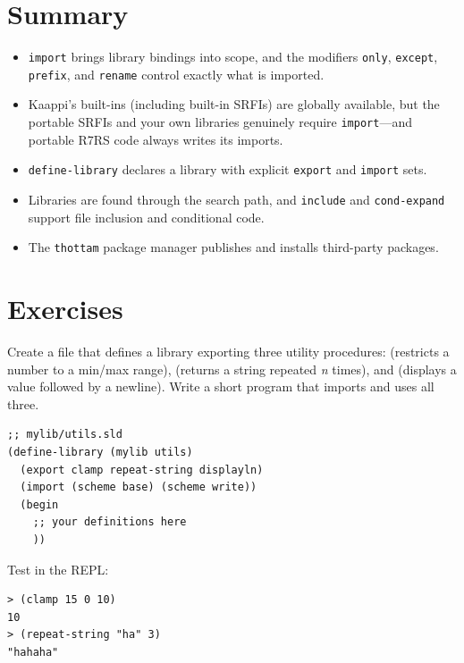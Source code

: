 \section*{Summary}

\begin{itemize}
    \item \texttt{import} brings library bindings into scope, and the modifiers \texttt{only}, \texttt{except}, \texttt{prefix}, and \texttt{rename} control exactly what is imported.
    \item Kaappi's built-ins (including \srfibuiltin{} built-in SRFIs) are globally available, but the \srfiportable{} portable SRFIs and your own libraries genuinely require \texttt{import}---and portable R7RS code always writes its imports.
    \item \texttt{define-library} declares a library with explicit \texttt{export} and \texttt{import} sets.
    \item Libraries are found through the search path, and \texttt{include} and \texttt{cond-expand} support file inclusion and conditional code.
    \item The \texttt{thottam} package manager publishes and installs third-party packages.
\end{itemize}

\section*{Exercises}

\begin{exercise}
Create a file  that defines a library  exporting three utility procedures:  (restricts a number to a min/max range),  (returns a string repeated \emph{n} times), and  (displays a value followed by a newline). Write a short program that imports and uses all three.

\begin{lstlisting}
;; mylib/utils.sld
(define-library (mylib utils)
  (export clamp repeat-string displayln)
  (import (scheme base) (scheme write))
  (begin
    ;; your definitions here
    ))
\end{lstlisting}

Test in the REPL:
\begin{lstlisting}[style=repl]
> (clamp 15 0 10)
10
> (repeat-string "ha" 3)
"hahaha"
\end{lstlisting}
\end{exercise}

